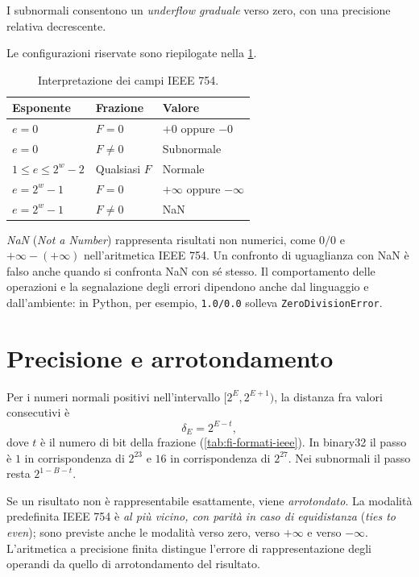 I subnormali consentono un \emph{underflow graduale} verso zero,
con una precisione relativa decrescente.

Le configurazioni riservate sono riepilogate nella
\cref{tab:fi-valori-speciali}.

\begin{table}[htbp]
  \centering
  \begin{tabular}{lll}
    \toprule
    Esponente & Frazione & Valore \\
    \midrule
    \(e=0\) & \(F=0\) & \(+0\) oppure \(-0\) \\
    \(e=0\) & \(F\ne0\) & Subnormale \\
    \(1\le e\le2^w-2\) & Qualsiasi \(F\) & Normale \\
    \(e=2^w-1\) & \(F=0\) & \(+\infty\) oppure \(-\infty\) \\
    \(e=2^w-1\) & \(F\ne0\) & NaN \\
    \bottomrule
  \end{tabular}
  \caption{Interpretazione dei campi IEEE 754.}
  \label{tab:fi-valori-speciali}
\end{table}

\emph{NaN} (\emph{Not a Number}) rappresenta risultati non numerici,
come \(0/0\) e \(+\infty-(+\infty)\) nell'aritmetica IEEE 754.
Un confronto di uguaglianza con NaN è falso anche quando si confronta
NaN con sé stesso. Il comportamento delle operazioni e la segnalazione
degli errori dipendono anche dal linguaggio e dall'ambiente: in Python,
per esempio, \texttt{1.0/0.0} solleva \texttt{ZeroDivisionError}.

\section{Precisione e arrotondamento}
\label{sec:fi-precisione-arrotondamento}

Per i numeri normali positivi nell'intervallo
\([2^E,2^{E+1})\), la distanza fra valori consecutivi è
\[
  \delta_E=2^{E-t},
\]
dove \(t\) è il numero di bit della frazione (\cref{tab:fi-formati-ieee}).
In binary32 il passo è \(1\) in corrispondenza di \(2^{23}\) e
\(16\) in corrispondenza di \(2^{27}\). Nei subnormali il passo
resta \(2^{1-B-t}\).

Se un risultato non è rappresentabile esattamente, viene
\emph{arrotondato}. La modalità predefinita IEEE 754 è
\emph{al più vicino, con parità in caso di equidistanza}
(\emph{ties to even}); sono previste anche le modalità verso zero,
verso \(+\infty\) e verso \(-\infty\). L'aritmetica a precisione
finita distingue l'errore di rappresentazione degli operandi da quello
di arrotondamento del risultato.

